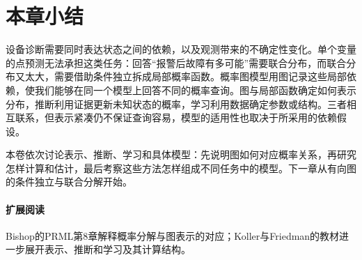 \section{本章小结}
\label{sec:pgm-overview-summary}

设备诊断需要同时表达状态之间的依赖，以及观测带来的不确定性变化。单个变量的点预测无法承担这类任务：回答“报警后故障有多可能”需要联合分布，而联合分布又太大，需要借助条件独立拆成局部概率函数。概率图模型用图记录这些局部依赖，使我们能够在同一个模型上回答不同的概率查询。图与局部函数确定如何表示分布，推断利用证据更新未知状态的概率，学习利用数据确定参数或结构。三者相互联系，但表示紧凑仍不保证查询容易，模型的适用性也取决于所采用的依赖假设。

本卷依次讨论表示、推断、学习和具体模型：先说明图如何对应概率关系，再研究怎样计算和估计，最后考察这些方法怎样组成不同任务中的模型。下一章从有向图的条件独立与联合分解开始。

\paragraph{扩展阅读}
Bishop的PRML第8章解释概率分解与图表示的对应；Koller与Friedman的教材进一步展开表示、推断和学习及其计算结构。
